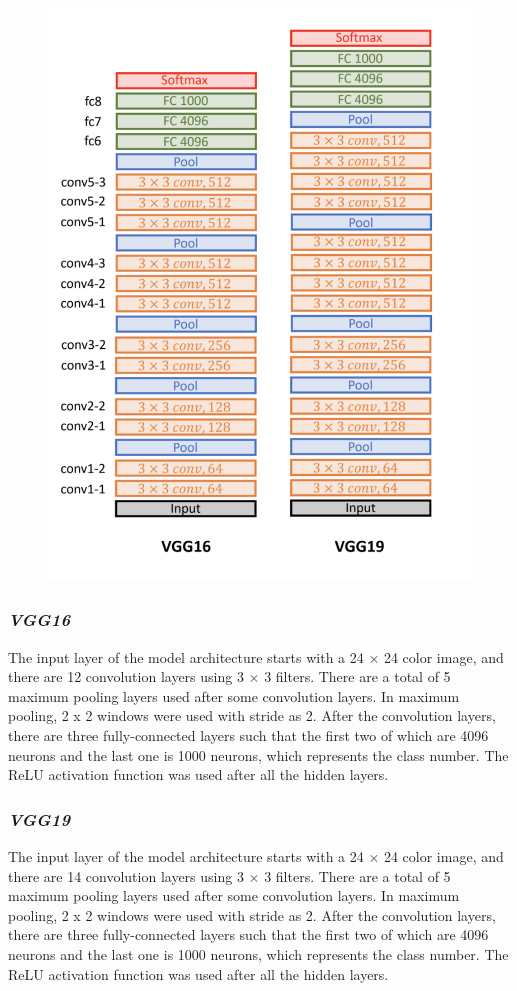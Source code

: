 \begin{figure}[h]
	\centering
	\includegraphics[width=.6\linewidth]{fig/vgg16_vgg19_archs.png}
	\label{fig:vgg16_vgg19_archs}
\end{figure}

\subsubsection*{\textit{VGG16}}

The input layer of the model architecture starts with a 24 × 24 color image, and there are 12 convolution layers using 3 × 3 filters. There are a total of 5 maximum pooling layers used after some convolution layers. In maximum pooling, 2 x 2 windows were used with stride as 2. After the convolution layers, there are three fully-connected layers such that the first two of which are 4096 neurons and the last one is 1000 neurons, which represents the class number. The ReLU activation function was used after all the hidden layers.

\subsubsection*{\textit{VGG19}}

The input layer of the model architecture starts with a 24 × 24 color image, and there are 14 convolution layers using 3 × 3 filters. There are a total of 5 maximum pooling layers used after some convolution layers. In maximum pooling, 2 x 2 windows were used with stride as 2. After the convolution layers, there are three fully-connected layers such that the first two of which are 4096 neurons and the last one is 1000 neurons, which represents the class number. The ReLU activation function was used after all the hidden layers.